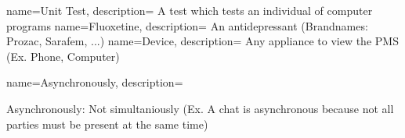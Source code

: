 {  
    name={Unit Test},
    description={
        A test which tests an individual of computer programs
    }
}
{  
    name={Fluoxetine},
    description={
        An antidepressant (Brandnames: Prozac, Sarafem, ...)
    }
}
{  
    name={Device},
    description={
      Any appliance to view the PMS (Ex. Phone, Computer)
    }
}
{  
    name={Asynchronously},
    description={
      Asynchronously: Not simultaniously (Ex. A chat is asynchronous because not all parties must be present at the same time)

    }
}
